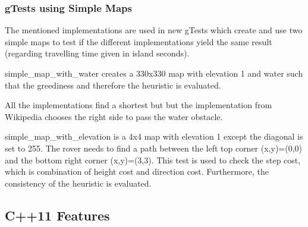 \subsubsection*{g\+Tests using Simple Maps}

The mentioned implementations are used in new g\+Tests which create and use two simple maps to test if the different implementations yield the same result (regarding travelling time given in island seconds).


\begin{DoxyEnumerate}
\item simple\+\_\+map\+\_\+with\+\_\+water creates a 330x330 map with elevation 1 and water such that the greediness and therefore the heuristic is evaluated.
\end{DoxyEnumerate}



All the implementations find a shortest but but the implementation from Wikipedia chooses the right side to pass the water obstacle.


\begin{DoxyEnumerate}
\item simple\+\_\+map\+\_\+with\+\_\+elevation is a 4x4 map with elevation 1 except the diagonal is set to 255. The rover needs to find a path between the left top corner (x,y)=(0,0) and the bottom right corner (x,y)=(3,3). This test is used to check the step cost, which is combination of height cost and direction cost. Furthermore, the consistency of the heuristic is evaluated.
\end{DoxyEnumerate}



\subsection*{C++11 Features}

